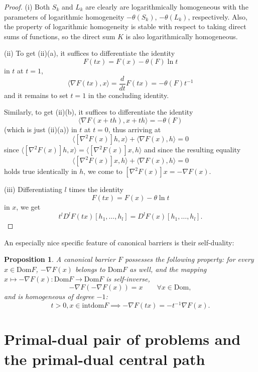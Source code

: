 \documentclass[11pt,a4paper]{article}
\newtheorem{prop}[thm]{Proposition}
\begin{document}
\begin{proof}
(i) Both $S_k$ and $L_k$ are clearly are logarithmically homogeneous with the parameters of logarithmic homogeneity $-\theta(S_k)$, $-\theta(L_k)$, respectively. Also, the property of logarithmic homogeneity is stable with respect to taking direct sums of functions, so the direct sum $K$ is also logarithmically homogeneous.

(ii) To get (ii)(a), it suffices to differentiate the identity
\[F(tx) = F(x)-\theta(F)\ln t\]
in $t$ at $t=1$,
\[\langle\nabla F(tx), x\rangle = \frac{d}{dt}F(tx) = -\theta(F)t^{-1}\]
and it remains to set $t=1$ in the concluding identity.

Similarly, to get (ii)(b), it suffices to differentiate the identity
\[\langle\nabla F(x+th), x+th\rangle = -\theta(F)\]
(which is just (ii)(a)) in $t$ at $t = 0$, thus arriving at
\[\langle[\nabla^2 F(x)]h, x\rangle+\langle\nabla F(x), h\rangle = 0\]
since $\langle[\nabla^2 F(x)]h, x\rangle = \langle[\nabla^2 F(x)]x, h\rangle$ and since the resulting equality
\[\langle[\nabla^2 F(x)]x, h\rangle+\langle\nabla F(x), h\rangle = 0\]
holds true identically in $h$, we come to $[\nabla^2 F(x)]x = -\nabla F(x)$.

(iii) Differentiating $l$ times the identity
\[F(tx) = F(x)-\theta \ln t\]
in $x$, we get
\[t^l D^l F(tx)[h_1, \dots, h_l] = D^l F(x)[h_1,\dots, h_l].\]
\end{proof}


An especially nice specific feature of canonical barriers is their self-duality:

\begin{prop}\label{prop:dual}
    A canonical barrier $F$ possesses the following property: for every $x \in \text{Dom}F$, $-\nabla F(x)$ belongs to $\text{Dom}F$ as well, and the mapping $x \mapsto -\nabla F(x) : \text{Dom}F \to \text{Dom}F$ is self-inverse,
    \begin{equation}
        -\nabla F(-\nabla F(x)) = x \qquad \forall x \in \text{Dom},
    \end{equation}
    and is homogeneous of degree $-1$:
    \begin{equation}
        t>0, x \in \text{intdom}F \implies -\nabla F(tx) = -t^{-1} \nabla F(x).
    \end{equation}
\end{prop}

\section{Primal-dual pair of problems and the primal-dual central path}
\end{document}

